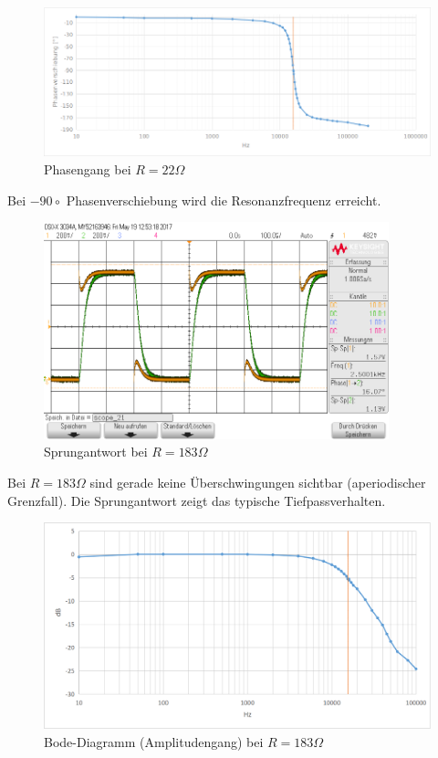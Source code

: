 \documentclass[12pt,a4paper,titlepage]{article}
\begin{document}
\begin{figure}[H]
  \centering
  \includegraphics[width=150mm]{phasengang_rlc_22.png}
  \caption{Phasengang bei $R=22\Omega$}
\end{figure}

\noindent Bei $-90{\circ}$ Phasenverschiebung wird die Resonanzfrequenz erreicht.

\begin{figure}[H]
  \centering
  \includegraphics[width=100mm]{sprungantwort_rlc_180.png}
  \caption{Sprungantwort bei $R=183\Omega$}
\end{figure}
\noindent Bei $R=183\Omega$ sind gerade keine \"Uberschwingungen sichtbar (aperiodischer Grenzfall). Die Sprungantwort zeigt das typische Tiefpassverhalten.

\begin{figure}[H]
  \centering
  \includegraphics[width=150mm]{bode_rlc_180.png}
  \caption{Bode-Diagramm (Amplitudengang) bei $R=183\Omega$}
\end{figure}
\end{document}
